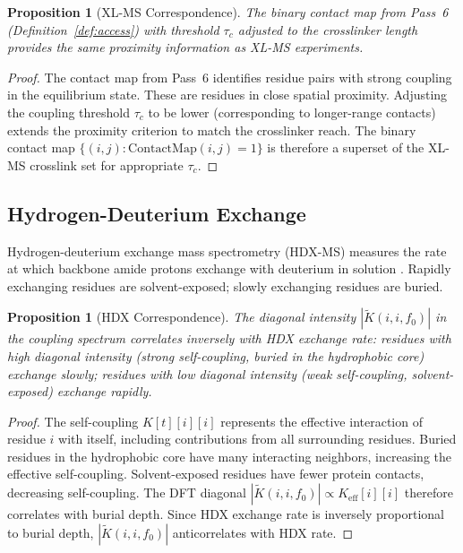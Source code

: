\documentclass[11pt,twocolumn,a4paper]{article}
\newtheorem{proposition}[theorem]{Proposition}
\theoremstyle{definition}
\theoremstyle{remark}
\newcommand{\Ktilde}{\tilde{K}}
\begin{document}
\begin{proposition}[XL-MS Correspondence]
\label{prop:xlms}
The binary contact map from Pass~6 (Definition~\ref{def:access}) with threshold $\tau_c$ adjusted to the crosslinker length provides the same proximity information as XL-MS experiments.
\end{proposition}

\begin{proof}
The contact map from Pass~6 identifies residue pairs with strong coupling in the equilibrium state. These are residues in close spatial proximity. Adjusting the coupling threshold $\tau_c$ to be lower (corresponding to longer-range contacts) extends the proximity criterion to match the crosslinker reach. The binary contact map $\{(i,j) : \text{ContactMap}(i,j) = 1\}$ is therefore a superset of the XL-MS crosslink set for appropriate $\tau_c$.
\end{proof}

\subsection{Hydrogen-Deuterium Exchange}

Hydrogen-deuterium exchange mass spectrometry (HDX-MS) measures the rate at which backbone amide protons exchange with deuterium in solution \citep{englander2006}. Rapidly exchanging residues are solvent-exposed; slowly exchanging residues are buried.

\begin{proposition}[HDX Correspondence]
\label{prop:hdx}
The diagonal intensity $|\Ktilde(i, i, f_0)|$ in the coupling spectrum correlates inversely with HDX exchange rate: residues with high diagonal intensity (strong self-coupling, buried in the hydrophobic core) exchange slowly; residues with low diagonal intensity (weak self-coupling, solvent-exposed) exchange rapidly.
\end{proposition}

\begin{proof}
The self-coupling $K[t][i][i]$ represents the effective interaction of residue $i$ with itself, including contributions from all surrounding residues. Buried residues in the hydrophobic core have many interacting neighbors, increasing the effective self-coupling. Solvent-exposed residues have fewer protein contacts, decreasing self-coupling. The DFT diagonal $|\Ktilde(i,i,f_0)| \propto K_{\text{eff}}[i][i]$ therefore correlates with burial depth. Since HDX exchange rate is inversely proportional to burial depth, $|\Ktilde(i,i,f_0)|$ anticorrelates with HDX rate.
\end{proof}
\end{document}
